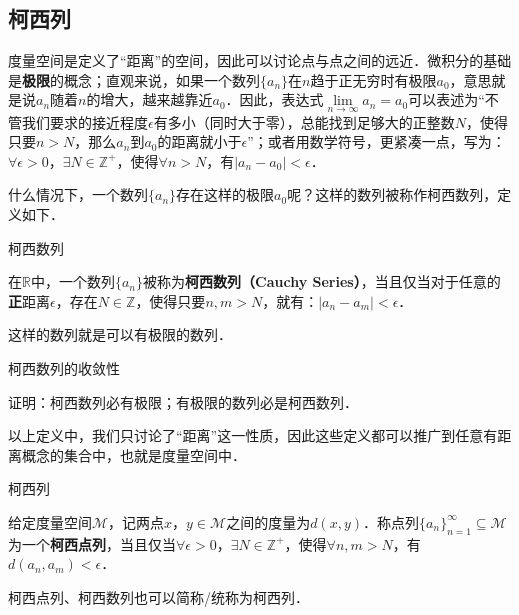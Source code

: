 

\subsection{柯西列}

度量空间是定义了“距离”的空间，因此可以讨论点与点之间的远近．微积分的基础是\textbf{极限}的概念；直观来说，如果一个数列$\{a_n\}$在$n$趋于正无穷时有极限$a_0$，意思就是说$a_n$随着$n$的增大，越来越靠近$a_0$．因此，表达式$\lim\limits_{n\rightarrow\infty}a_n=a_0$可以表述为“不管我们要求的接近程度$\epsilon$有多小（同时大于零），总能找到足够大的正整数$N$，使得只要$n>N$，那么$a_n$到$a_0$的距离就小于$\epsilon$”；或者用数学符号，更紧凑一点，写为：$\forall\epsilon>0$，$\exists N\in\mathbb{Z}^+$，使得$\forall n>N$，有$|a_n-a_0|<\epsilon$．

什么情况下，一个数列$\{a_n\}$存在这样的极限$a_0$呢？这样的数列被称作柯西数列，定义如下．

\begin{definition}{柯西数列}

在$\mathbb{R}$中，一个数列$\{a_n\}$被称为\textbf{柯西数列（Cauchy Series）}，当且仅当对于任意的\textbf{正}距离$\epsilon$，存在$N\in\mathbb{Z}$，使得只要$n, m>N$，就有：$|a_n-a_m|<\epsilon$．

\end{definition}

这样的数列就是可以有极限的数列．

\begin{exercise}{柯西数列的收敛性}

证明：柯西数列必有极限；有极限的数列必是柯西数列．

\end{exercise}

以上定义中，我们只讨论了“距离”这一性质，因此这些定义都可以推广到任意有距离概念的集合中，也就是度量空间中．

\begin{definition}{柯西列}

给定度量空间$\mathcal{M}$，记两点$x$，$y\in\mathcal{M}$之间的度量为$d(x, y)$．称点列$\{a_n\}_{n=1}^{\infty}\subseteq\mathcal{M}$为一个\textbf{柯西点列}，当且仅当$\forall\epsilon>0$，$\exists N\in\mathbb{Z}^+$，使得$\forall n, m>N$，有$d(a_n, a_m)<\epsilon$．

\end{definition}


柯西点列、柯西数列也可以简称/统称为柯西列．

